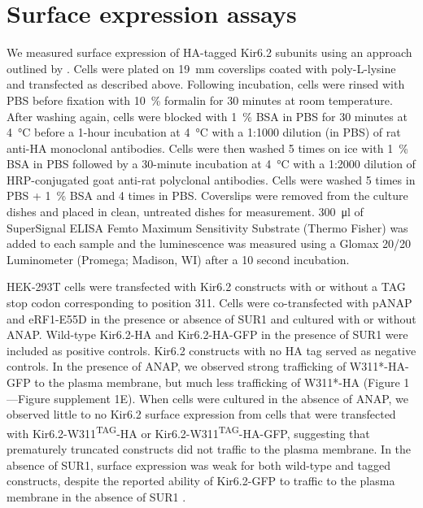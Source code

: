 \section{Surface expression assays}
We measured surface expression of HA-tagged Kir6.2 subunits using an approach outlined by \textcite{zerangue_new_1999}.
Cells were plated on \SI{19}{\milli\metre} coverslips coated with poly-L-lysine and transfected as described above.
Following incubation, cells were rinsed with PBS before fixation with \SI{10}{\percent} formalin for 30 minutes at room temperature.
After washing again, cells were blocked with \SI{1}{\percent} BSA in PBS for 30 minutes at \SI{4}{\degreeCelsius} before a 1-hour incubation at \SI{4}{\degreeCelsius} with a 1:1000 dilution (in PBS) of rat anti-HA monoclonal antibodies.
Cells were then washed 5 times on ice with \SI{1}{\percent} BSA in PBS followed by a 30-minute incubation at \SI{4}{\degreeCelsius} with a 1:2000 dilution of HRP-conjugated goat anti-rat polyclonal antibodies.
Cells were washed 5 times in PBS + \SI{1}{\percent} BSA and 4 times in PBS.
Coverslips were removed from the culture dishes and placed in clean, untreated dishes for measurement.
\SI{300}{\micro\litre} of SuperSignal ELISA Femto Maximum Sensitivity Substrate (Thermo Fisher) was added to each sample and the luminescence was measured using a Glomax 20/20 Luminometer (Promega; Madison, WI) after a 10 second incubation.

HEK-293T cells were transfected with Kir6.2 constructs with or without a TAG stop codon corresponding to position 311.
Cells were co-transfected with pANAP and eRF1-E55D in the presence or absence of SUR1 and cultured with or without ANAP.
Wild-type Kir6.2-HA and Kir6.2-HA-GFP in the presence of SUR1 were included as positive controls.
Kir6.2 constructs with no HA tag served as negative controls.
In the presence of ANAP, we observed strong trafficking of W311*-HA-GFP to the plasma membrane, but much less trafficking of W311*-HA (Figure 1—Figure supplement 1E).
When cells were cultured in the absence of ANAP, we observed little to no Kir6.2 surface expression from cells that were transfected with Kir6.2-W311\textsuperscript{TAG}-HA or Kir6.2-W311\textsuperscript{TAG}-HA-GFP, suggesting that prematurely truncated constructs did not traffic to the plasma membrane.
In the absence of SUR1, surface expression was weak for both wild-type and tagged constructs, despite the reported ability of Kir6.2-GFP to traffic to the plasma membrane in the absence of SUR1 \cite{john_sulphonylurea_1998-1}.

